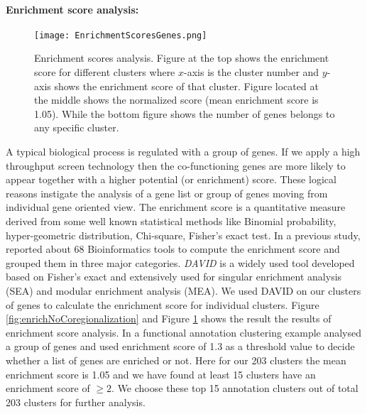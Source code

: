 \paragraph{Enrichment score analysis:}
\begin{figure}
 \begin{center}
 \texttt{[image: EnrichmentScoresGenes.png]}
  \caption [Enrichment scores analysis for different clusters] 
  {Enrichment scores analysis. Figure at the top shows the enrichment score for different clusters where $x$-axis is the cluster number and $y$-axis shows the enrichment score of that cluster. Figure located at the middle shows the normalized score (mean enrichment score is 1.05). While the bottom figure shows the number of genes belongs to any specific cluster.
  \label{fig:EnrichmentScores}}
 \end{center}
\end{figure}

A typical biological process is regulated with a group of genes. If we apply a high throughput screen technology then the co-functioning genes are more likely to appear together with a higher potential (or enrichment) score. These logical reasons instigate the analysis of a gene list or group of genes moving from individual gene oriented view. The enrichment score is a quantitative measure derived from some well known statistical methods like Binomial probability, hyper-geometric distribution, Chi-square, Fisher's exact test. In a previous study, \cite{Huang:2009Enrichment} reported about 68 Bioinformatics tools to compute the enrichment score and grouped them in three major categories. \emph{DAVID} \cite{Huang:2009David} is a widely used tool developed based on Fisher's exact and extensively used for singular enrichment analysis (SEA) and modular enrichment analysis (MEA). We used DAVID on our clusters of genes to calculate the enrichment score for individual clusters.  Figure \ref{fig:enrichNoCoregionalization} and Figure \ref{fig:EnrichmentScores} shows the result the results of enrichment score analysis. In a functional annotation clustering example \cite{Huang:2007} analysed a group of genes and used enrichment score of 1.3 as a threshold value to decide whether a list of genes are enriched or not. Here for our 203 clusters the mean enrichment score is 1.05 and we have found at least 15 clusters have an enrichment score of $\geq 2$. We choose these top 15 annotation clusters out of total 203 clusters for further analysis.

